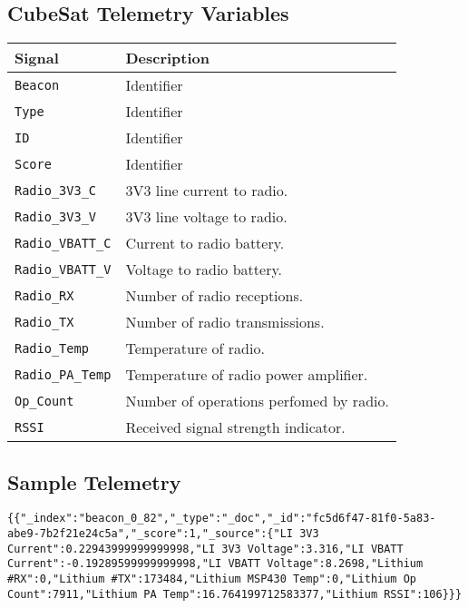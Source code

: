 \subsection{CubeSat Telemetry Variables}

\begin{table}[!h]
\centering
\begin{tabular}{ll} 
\hline\hline
\textbf{Signal} & \textbf{Description}                     \\ 
\hline
\texttt{Beacon}          & Identifier                               \\
\texttt{Type}            & Identifier                               \\
\texttt{ID}              & Identifier                               \\
\texttt{Score}           & Identifier                               \\
\texttt{Radio\_3V3\_C}   & 3V3 line current to radio.               \\
\texttt{Radio\_3V3\_V}   & 3V3 line voltage to radio.               \\
\texttt{Radio\_VBATT\_C} & Current to radio battery.                \\
\texttt{Radio\_VBATT\_V} & Voltage to radio battery.                \\
\texttt{Radio\_RX}       & Number of radio receptions.              \\
\texttt{Radio\_TX}       & Number of radio transmissions.           \\
\texttt{Radio\_Temp}     & Temperature of radio.                    \\
\texttt{Radio\_PA\_Temp} & Temperature of radio power amplifier.    \\
\texttt{Op\_Count}       & Number of operations perfomed by radio.  \\
\texttt{RSSI}            & Received signal strength indicator.      \\
\hline\hline
\end{tabular}
\end{table}

\subsection{Sample Telemetry}

\begin{lstlisting}
{{"_index":"beacon_0_82","_type":"_doc","_id":"fc5d6f47-81f0-5a83-abe9-7b2f21e24c5a","_score":1,"_source":{"LI 3V3 Current":0.22943999999999998,"LI 3V3 Voltage":3.316,"LI VBATT Current":-0.19289599999999998,"LI VBATT Voltage":8.2698,"Lithium #RX":0,"Lithium #TX":173484,"Lithium MSP430 Temp":0,"Lithium Op Count":7911,"Lithium PA Temp":16.764199712583377,"Lithium RSSI":106}}}
\end{lstlisting}

